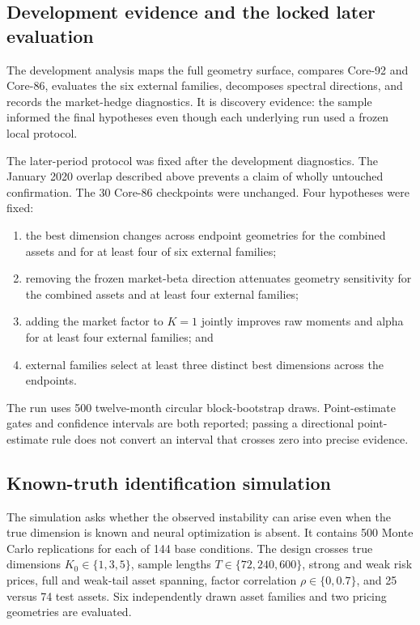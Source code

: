 \subsection{Development evidence and the locked later evaluation}

The development analysis maps the full geometry surface, compares Core-92 and Core-86, evaluates the six external families, decomposes spectral directions, and records the market-hedge diagnostics. It is discovery evidence: the sample informed the final hypotheses even though each underlying run used a frozen local protocol.

The later-period protocol was fixed after the development diagnostics. The January 2020 overlap described above prevents a claim of wholly untouched confirmation. The 30 Core-86 checkpoints were unchanged. Four hypotheses were fixed:
\begin{enumerate}
 \item the best dimension changes across endpoint geometries for the combined assets and for at least four of six external families;
 \item removing the frozen market-beta direction attenuates geometry sensitivity for the combined assets and at least four external families;
 \item adding the market factor to $K=1$ jointly improves raw moments and alpha for at least four external families; and
 \item external families select at least three distinct best dimensions across the endpoints.
\end{enumerate}
The run uses 500 twelve-month circular block-bootstrap draws. Point-estimate gates and confidence intervals are both reported; passing a directional point-estimate rule does not convert an interval that crosses zero into precise evidence.

\subsection{Known-truth identification simulation}

The simulation asks whether the observed instability can arise even when the true dimension is known and neural optimization is absent. It contains 500 Monte Carlo replications for each of 144 base conditions. The design crosses true dimensions $K_0\in\{1,3,5\}$, sample lengths $T\in\{72,240,600\}$, strong and weak risk prices, full and weak-tail asset spanning, factor correlation $\rho\in\{0,0.7\}$, and 25 versus 74 test assets. Six independently drawn asset families and two pricing geometries are evaluated.

